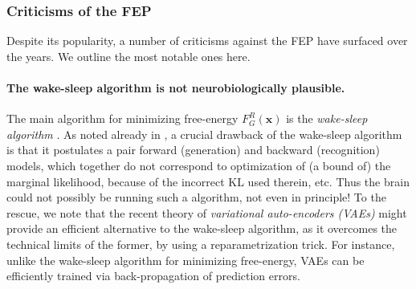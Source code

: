 \documentclass[10pt,letterpaper]{article}
\def\x{\mathbf{x}}
\begin{document}

\subsubsection{Criticisms of the FEP}
  Despite its popularity, a number of criticisms against the FEP have surfaced over the years. We outline the most notable ones here.
  
\paragraph{The wake-sleep algorithm is not neurobiologically plausible.}
The main algorithm for minimizing free-energy $F_G^R(\x)$ is the \textit{wake-sleep algorithm}
\citep{dayan1995helmholtz}. As noted already in \citep{dayan1995helmholtz},
a crucial drawback of the wake-sleep algorithm is that it postulates a pair forward (generation) and backward (recognition) models,
which together do not correspond to optimization of (a bound of) the marginal likelihood, because of the incorrect KL used therein, etc.
Thus the brain could not possibly be running such a algorithm, not even in principle! To the rescue, we note that the recent theory of
\textit{variational auto-encoders (VAEs)} \citep{kingma2013auto} might provide an efficient alternative to the wake-sleep algorithm,
as it overcomes the technical limits of the former, by using a reparametrization trick. For instance, unlike the wake-sleep algorithm
for minimizing free-energy, VAEs can be efficiently trained via back-propagation of prediction errors.
\end{document}
